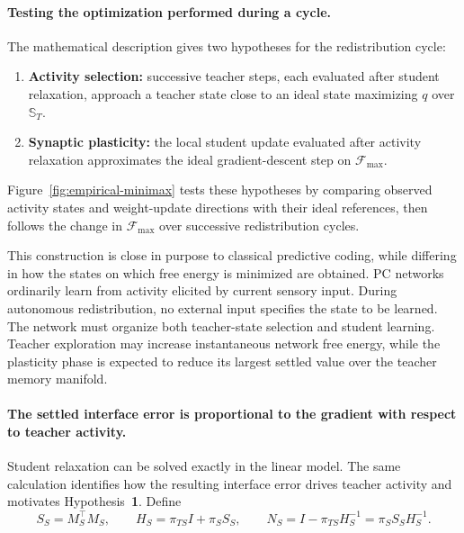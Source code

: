 \documentclass[10pt,letterpaper]{article}
\theoremstyle{plain}
\theoremstyle{remark}
\begin{document}
\paragraph{Testing the optimization performed during a cycle.}
The mathematical description gives two hypotheses for the redistribution cycle:
\begin{enumerate}
    \item \textbf{Activity selection:} successive teacher steps, each evaluated after student relaxation, approach a teacher state close to an ideal state maximizing \(q\) over \(\mathbb S_T\).
    \item \textbf{Synaptic plasticity:} the local student update evaluated after activity relaxation approximates the ideal gradient-descent step on \(\mathcal F_{\max}\).
\end{enumerate}
Figure~\ref{fig:empirical-minimax} tests these hypotheses by comparing observed activity states and weight-update directions with their ideal references, then follows the change in \(\mathcal F_{\max}\) over successive redistribution cycles.

This construction is close in purpose to classical predictive coding, while differing in how the states on which free energy is minimized are obtained. PC networks ordinarily learn from activity elicited by current sensory input. During autonomous redistribution, no external input specifies the state to be learned. The network must organize both teacher-state selection and student learning. Teacher exploration may increase instantaneous network free energy, while the plasticity phase is expected to reduce its largest settled value over the teacher memory manifold.

\paragraph{The settled interface error is proportional to the gradient with respect to teacher activity.}
Student relaxation can be solved exactly in the linear model. The same calculation identifies how the resulting interface error drives teacher activity and motivates Hypothesis~\textbf{1}. Define
\begin{equation}
S_S=M_S^\top M_S,\qquad
H_S=\pi_{TS}I+\pi_SS_S,\qquad
N_S=I-\pi_{TS}H_S^{-1}=\pi_SS_SH_S^{-1}.
\label{eq:empirical-novelty-operator}
\end{equation}
\end{document}
